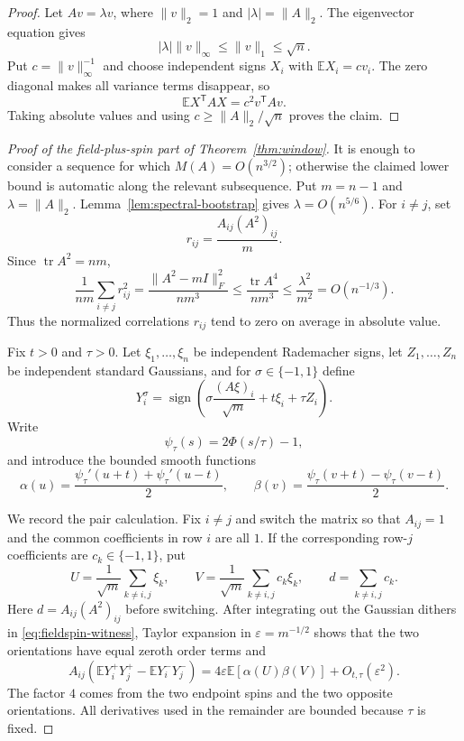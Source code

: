 \documentclass[11pt]{article}
\theoremstyle{definition}
\theoremstyle{remark}
\newcommand{\E}{\mathbb E}
\newcommand{\sgn}{\operatorname{sign}}
\begin{document}
\begin{proof}
Let $Av=\lambda v$, where $\|v\|_2=1$ and
$|\lambda|=\|A\|_2$.  The eigenvector equation gives
\[
 |\lambda|\|v\|_\infty\le\|v\|_1\le\sqrt n.
\]
Put $c=\|v\|_\infty^{-1}$ and choose independent signs $X_i$ with
$\E X_i=cv_i$.  The zero diagonal makes all variance terms disappear, so
\[
 \E X^{\mathsf T}AX=c^2v^{\mathsf T}Av.
\]
Taking absolute values and using
$c\ge\|A\|_2/\sqrt n$ proves the claim.
\end{proof}

\begin{proof}[Proof of the field-plus-spin part of
Theorem~\ref{thm:window}]
It is enough to consider a sequence for which $M(A)=O(n^{3/2})$; otherwise
the claimed lower bound is automatic along the relevant subsequence.  Put
$m=n-1$ and $\lambda=\|A\|_2$.  Lemma~\ref{lem:spectral-bootstrap} gives
$\lambda=O(n^{5/6})$.  For $i\ne j$, set
\[
 r_{ij}=\frac{A_{ij}(A^2)_{ij}}m.
\]
Since $\operatorname{tr}A^2=nm$,
\begin{equation}\label{eq:mean-decorrelation}
 \frac1{nm}\sum_{i\ne j}r_{ij}^2
 =\frac{\|A^2-mI\|_F^2}{nm^3}
 \le\frac{\operatorname{tr}A^4}{nm^3}
 \le\frac{\lambda^2}{m^2}=O(n^{-1/3}).
\end{equation}
Thus the normalized correlations $r_{ij}$ tend to zero on average in
absolute value.

Fix $t>0$ and $\tau>0$.  Let $\xi_1,\ldots,\xi_n$ be independent
Rademacher signs, let $Z_1,\ldots,Z_n$ be independent standard Gaussians,
and for $\sigma\in\{-1,1\}$ define
\begin{equation}\label{eq:fieldspin-witness}
 Y_i^\sigma=\sgn\!\left(
  \sigma\frac{(A\xi)_i}{\sqrt m}+t\xi_i+\tau Z_i
 \right).
\end{equation}
Write
\[
 \psi_\tau(s)=2\Phi(s/\tau)-1,
\]
and introduce the bounded smooth functions
\[
 \alpha(u)=\frac{\psi_\tau'(u+t)+\psi_\tau'(u-t)}2,
 \qquad
 \beta(v)=\frac{\psi_\tau(v+t)-\psi_\tau(v-t)}2.
\]

We record the pair calculation.  Fix $i\ne j$ and switch the matrix so that
$A_{ij}=1$ and the common coefficients in row $i$ are all $1$.  If the
corresponding row-$j$ coefficients are $c_k\in\{-1,1\}$, put
\[
 U=\frac1{\sqrt m}\sum_{k\ne i,j}\xi_k,
 \qquad
 V=\frac1{\sqrt m}\sum_{k\ne i,j}c_k\xi_k,
 \qquad
 d=\sum_{k\ne i,j}c_k.
\]
Here $d=A_{ij}(A^2)_{ij}$ before switching.  After integrating out the
Gaussian dithers in \eqref{eq:fieldspin-witness}, Taylor expansion in
$\varepsilon=m^{-1/2}$ shows that the two orientations have equal zeroth
order terms and
\begin{equation}\label{eq:pair-response}
 A_{ij}\left(
  \E Y_i^+Y_j^+-\E Y_i^-Y_j^-
 \right)
 =4\varepsilon\E[\alpha(U)\beta(V)]+O_{t,\tau}(\varepsilon^2).
\end{equation}
The factor $4$ comes from the two endpoint spins and the two opposite
orientations.  All derivatives used in the remainder are bounded because
$\tau$ is fixed.


\end{proof}
\end{document}
